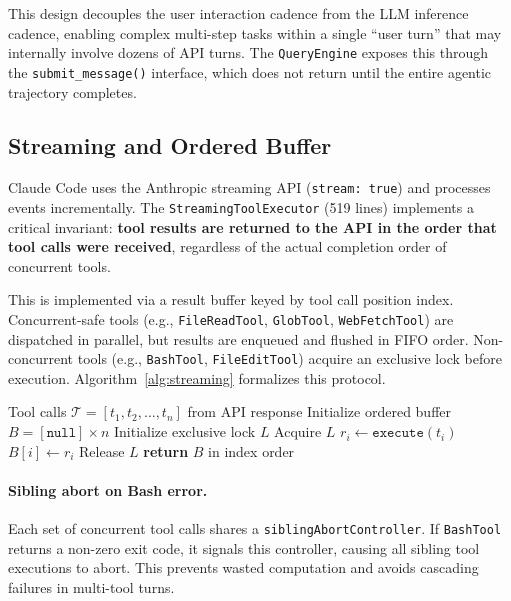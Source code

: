 \documentclass{article}
\begin{document}
This design decouples the user interaction cadence from the LLM inference cadence, enabling complex multi-step tasks within a single ``user turn'' that may internally involve dozens of API turns. The \texttt{QueryEngine} exposes this through the \texttt{submit\_message()} interface, which does not return until the entire agentic trajectory completes.

\subsection{Streaming and Ordered Buffer}

Claude Code uses the Anthropic streaming API (\texttt{stream: true}) and processes events incrementally. The \texttt{StreamingToolExecutor} (519 lines) implements a critical invariant: \textbf{tool results are returned to the API in the order that tool calls were received}, regardless of the actual completion order of concurrent tools.

This is implemented via a result buffer keyed by tool call position index. Concurrent-safe tools (e.g., \texttt{FileReadTool}, \texttt{GlobTool}, \texttt{WebFetchTool}) are dispatched in parallel, but results are enqueued and flushed in FIFO order. Non-concurrent tools (e.g., \texttt{BashTool}, \texttt{FileEditTool}) acquire an exclusive lock before execution. Algorithm~\ref{alg:streaming} formalizes this protocol.

\begin{algorithm}[t]
\caption{Ordered Concurrent Tool Execution}
\label{alg:streaming}
\begin{algorithmic}[1]
\REQUIRE Tool calls $\mathcal{T} = [t_1, t_2, \ldots, t_n]$ from API response
\STATE Initialize ordered buffer $B = [\texttt{null}] \times n$
\STATE Initialize exclusive lock $L$
    \STATE Acquire $L$
  \ENDIF
  \STATE $r_i \leftarrow \texttt{execute}(t_i)$
  \STATE $B[i] \leftarrow r_i$
    \STATE Release $L$
  \ENDIF
\ENDFOR
\STATE \textbf{return} $B$ in index order 
\end{algorithmic}
\end{algorithm}

\paragraph{Sibling abort on Bash error.} Each set of concurrent tool calls shares a \texttt{siblingAbortController}. If \texttt{BashTool} returns a non-zero exit code, it signals this controller, causing all sibling tool executions to abort. This prevents wasted computation and avoids cascading failures in multi-tool turns.
\end{document}
